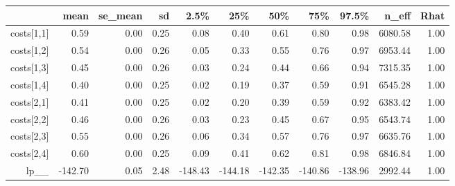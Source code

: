 \begin{table}[ht]
\centering
\begin{tabular}{rrrrrrrrrrr}
  \hline
 & mean & se\_mean & sd & 2.5\% & 25\% & 50\% & 75\% & 97.5\% & n\_eff & Rhat \\ 
  \hline
costs[1,1] & 0.59 & 0.00 & 0.25 & 0.08 & 0.40 & 0.61 & 0.80 & 0.98 & 6080.58 & 1.00 \\ 
  costs[1,2] & 0.54 & 0.00 & 0.26 & 0.05 & 0.33 & 0.55 & 0.76 & 0.97 & 6953.44 & 1.00 \\ 
  costs[1,3] & 0.45 & 0.00 & 0.26 & 0.03 & 0.24 & 0.44 & 0.66 & 0.94 & 7315.35 & 1.00 \\ 
  costs[1,4] & 0.40 & 0.00 & 0.25 & 0.02 & 0.19 & 0.37 & 0.59 & 0.91 & 6545.28 & 1.00 \\ 
  costs[2,1] & 0.41 & 0.00 & 0.25 & 0.02 & 0.20 & 0.39 & 0.59 & 0.92 & 6383.42 & 1.00 \\ 
  costs[2,2] & 0.46 & 0.00 & 0.26 & 0.03 & 0.23 & 0.45 & 0.67 & 0.95 & 6543.74 & 1.00 \\ 
  costs[2,3] & 0.55 & 0.00 & 0.26 & 0.06 & 0.34 & 0.57 & 0.76 & 0.97 & 6635.76 & 1.00 \\ 
  costs[2,4] & 0.60 & 0.00 & 0.25 & 0.09 & 0.41 & 0.62 & 0.81 & 0.98 & 6846.84 & 1.00 \\ 
  lp\_\_ & -142.70 & 0.05 & 2.48 & -148.43 & -144.18 & -142.35 & -140.86 & -138.96 & 2992.44 & 1.00 \\ 
   \hline
\end{tabular}
\end{table}
